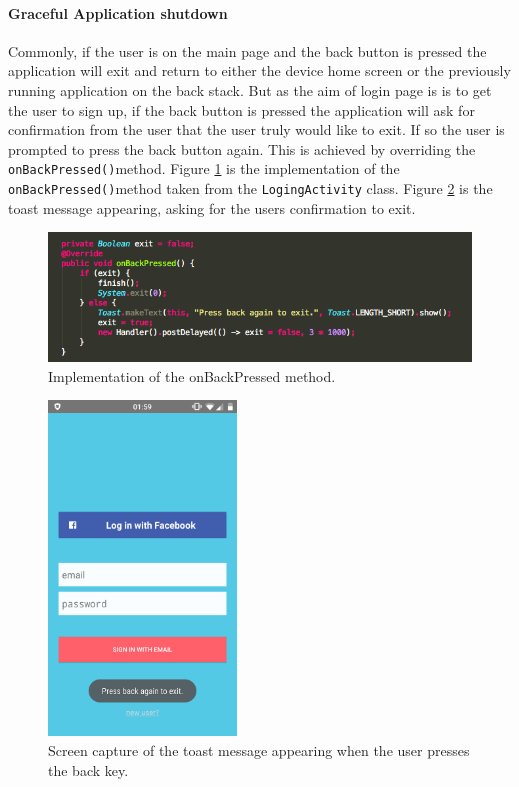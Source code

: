\documentclass[a4paper, 11pt]{article}
\begin{document}
\paragraph{Graceful Application shutdown}
Commonly, if the user is on the main page and the back button is pressed the application will exit and return to either the device home screen or the previously running application on the back stack. But as the aim of login page is is to get the user to sign up, if the back button is pressed the application will ask for confirmation from the user that the user truly would like to exit. If so the user is prompted to press the back button again. This is achieved by overriding the \texttt{onBackPressed()}method. Figure \ref{fig:onBack} is the implementation of the  \texttt{onBackPressed()}method taken from the \texttt{LogingActivity} class. Figure \ref{fig:back} is the toast message appearing, asking for the users confirmation to exit.

\vspace{\baselineskip}

\begin{figure}[h]
\centering
\includegraphics[width=\textwidth]{onBack}
\caption{Implementation of the onBackPressed method.} \label{fig:onBack}
\end{figure}

\vspace{\baselineskip}

\begin{figure}[!htbp]
\centering
\includegraphics[width=5cm]{back}
\caption{Screen capture of the toast message appearing when the user presses the back key.} \label{fig:back}
\end{figure}
\end{document}
